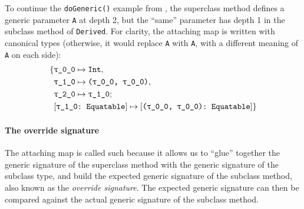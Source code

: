 \documentclass[../generics]{subfiles}
\begin{document}
\begin{example}
To continue the \texttt{doGeneric()} example from , the superclass method defines a generic parameter \texttt{A} at depth 2, but the ``same'' parameter has depth 1 in the subclass method of \texttt{Derived}. For clarity, the attaching map is written with canonical types (otherwise, it would replace \texttt{A} with \texttt{A}, with a different meaning of \texttt{A} on each side):
\begin{align*}
\SubstMapC{
&\SubstType{\ttgp{0}{0}}{Int},\\
&\SubstType{\ttgp{1}{0}}{(\ttgp{0}{0}, \ttgp{0}{0})},\\
&\SubstType{\ttgp{2}{0}}{\ttgp{1}{0}}
}{
\\
&\SubstConf{\ttgp{1}{0}}{(\ttgp{0}{0}, \ttgp{0}{0})}{Equatable}
}
\end{align*}
\end{example}

\paragraph{The override signature}
The attaching map is called such because it allows us to ``glue'' together the generic signature of the superclass method with the generic signature of the subclass type, and build the expected generic signature of the subclass method, also known as the \emph{override signature}. The expected generic signature can then be compared against the actual generic signature of the subclass method.
\end{document}
